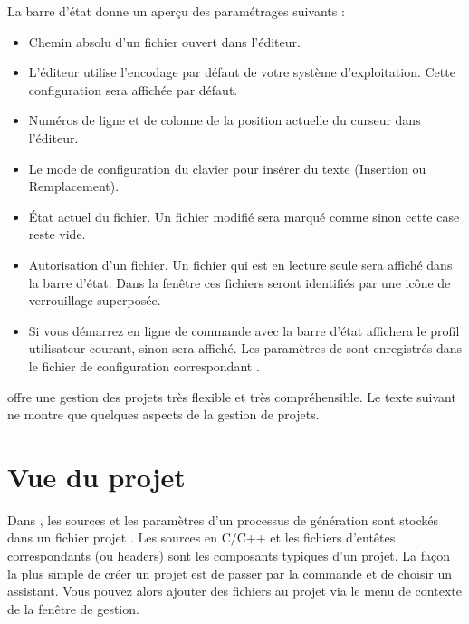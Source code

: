 La barre d'état donne un aperçu des paramétrages suivants :

\begin{itemize}
\item Chemin absolu d'un fichier ouvert dans l'éditeur.
\item L'éditeur utilise l'encodage par défaut de votre système d'exploitation. Cette configuration sera affichée par défaut.
\item Numéros de ligne et de colonne de la position actuelle du curseur dans l'éditeur.
\item Le mode de configuration du clavier pour insérer du texte (Insertion ou Remplacement).
\item État actuel du fichier. Un fichier modifié sera marqué comme  sinon cette case reste vide. 
\item Autorisation d'un fichier. Un fichier qui est en lecture seule sera affiché  dans la barre d'état. Dans la fenêtre  ces fichiers seront identifiés par une icône de verrouillage superposée.


\item Si vous démarrez \codeblocks en ligne de commande avec  la barre d'état affichera le profil utilisateur courant, sinon  sera affiché. Les paramètres de \codeblocks sont enregistrés dans le fichier de configuration correspondant .
\end{itemize}

\codeblocks offre une gestion des projets très flexible et très compréhensible. Le texte suivant ne montre que quelques aspects de la gestion de projets.

\section{Vue du projet}\label{sec:categories}

Dans \codeblocks, les sources et les paramètres d'un processus de génération sont stockés dans un fichier projet . Les sources en C/C++ et les fichiers d'entêtes correspondants (ou headers) sont les composants typiques d'un projet. La façon la plus simple de créer un projet est de passer par la commande  et de choisir un assistant. Vous pouvez alors ajouter des fichiers au projet via le menu de contexte  de la fenêtre de gestion. 

